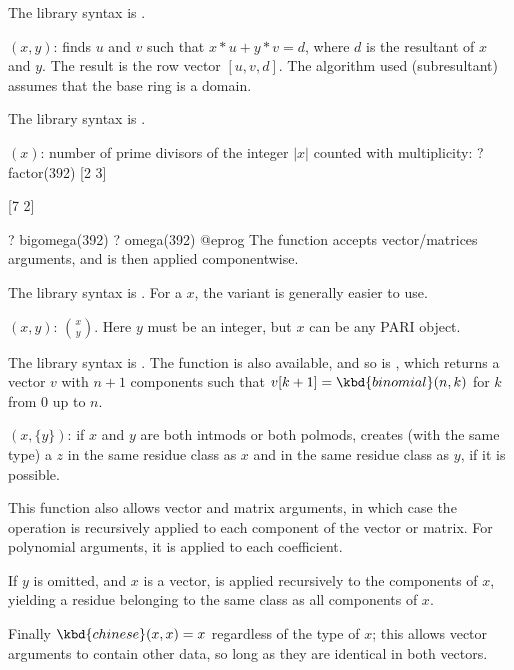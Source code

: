 The library syntax is .

$(x,y)$: \label{se:bezoutres}finds $u$ and $v$ such that $x*u + y*v = d$, where $d$ is the resultant
of $x$ and $y$. The result is the row vector $[u,v,d]$. 
The algorithm used (subresultant) assumes that the base ring is a domain.

The library syntax is .

$(x)$: \label{se:bigomega}number of prime divisors of the integer $|x|$ counted with
multiplicity:
\bprog
? factor(392)
[2 3]

[7 2]

? bigomega(392)
? omega(392)
@eprog
The function accepts vector/matrices arguments, and is then applied
componentwise.

The library syntax is .
For a  $x$, the variant
 is generally easier to use.

$(x,y)$: \label{se:binomial} $\binom{x}{y}$.
Here $y$ must be an integer, but $x$ can be any PARI object.

The library syntax is .
The function
 is also available, and so is
, which returns a vector $v$
with $n+1$ components such that $v[k+1] = \kbd{binomial}(n,k)$ for $k$ from
$0$ up to $n$.

$(x,\{y\})$: \label{se:chinese}if $x$ and $y$ are both intmods or both
polmods, creates (with the same type) a $z$ in the same residue class
as $x$ and in the same residue class as $y$, if it is possible.

This function also allows vector and matrix arguments, in which case the
operation is recursively applied to each component of the vector or matrix.
For polynomial arguments, it is applied to each coefficient.

If $y$ is omitted, and $x$ is a vector,  is applied recursively
to the components of $x$, yielding a residue belonging to the same class as all
components of $x$.

Finally $\kbd{chinese}(x,x) = x$ regardless of the type of $x$; this allows
vector arguments to contain other data, so long as they are identical in both
vectors.

